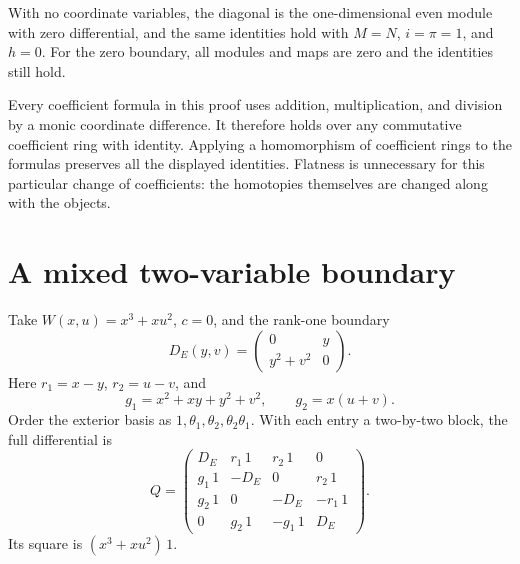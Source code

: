 With no coordinate variables, the diagonal is the one-dimensional
even module with zero differential, and the same identities hold
with \(M=N\), \(i=\pi=1\), and \(h=0\).
For the zero boundary, all modules and maps are zero and the
identities still hold.

Every coefficient formula in this proof uses addition,
multiplication, and division by a monic coordinate difference.
It therefore holds over any commutative coefficient ring with
identity. Applying a homomorphism of coefficient rings to the
formulas preserves all the displayed identities. Flatness is
unnecessary for this particular change of coefficients: the
homotopies themselves are changed along with the objects.

\section{A mixed two-variable boundary}
\label{sec:da-mixed}

Take \(W(x,u)=x^3+xu^2\), \(c=0\), and the rank-one boundary
\[
 D_E(y,v)=
 \begin{pmatrix}0&y\\y^2+v^2&0\end{pmatrix}.
\]
Here \(r_1=x-y\), \(r_2=u-v\), and
\[
 g_1=x^2+xy+y^2+v^2,\qquad g_2=x(u+v).
\]
Order the exterior basis as \(1,\theta_1,\theta_2,\theta_2\theta_1\).
With each entry a two-by-two block, the full differential is
\[
 Q=
 \begin{pmatrix}
 D_E&r_1\,1&r_2\,1&0\\
 g_1\,1&-D_E&0&r_2\,1\\
 g_2\,1&0&-D_E&-r_1\,1\\
 0&g_2\,1&-g_1\,1&D_E
 \end{pmatrix}.
\]
Its square is \((x^3+xu^2)\,1\).

